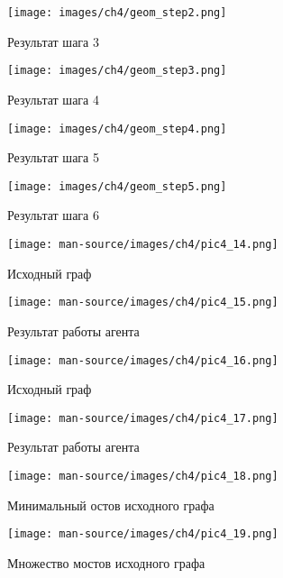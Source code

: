 \documentclass{thesisby}
\begin{document}
\begin{figure}[H]
    \centering
    \texttt{[image: images/ch4/geom\_step2.png]}
    \caption{Результат шага 3}
    \label{fig:pic_geom_step_2}
\end{figure}


\begin{figure}[H]
    \centering
    \texttt{[image: images/ch4/geom\_step3.png]}
    \caption{Результат шага 4}
    \label{fig:pic_geom_step_3}
\end{figure}


\begin{figure}[H]
    \centering
    \texttt{[image: images/ch4/geom\_step4.png]}
    \caption{Результат шага 5}
    \label{fig:pic_geom_step_4}
\end{figure}


\begin{figure}[H]
    \centering
    \texttt{[image: images/ch4/geom\_step5.png]}
    \caption{Результат шага 6}
    \label{fig:pic_geom_step_5}
\end{figure}


\begin{figure}[H]
    \centering
    \texttt{[image: man-source/images/ch4/pic4\_14.png]}
    \caption{Исходный граф}
    \label{fig:pic4_14}
\end{figure}


\begin{figure}[H]
    \centering
    \texttt{[image: man-source/images/ch4/pic4\_15.png]}
    \caption{Результат работы агента}
    \label{fig:pic4_15}
\end{figure}


\begin{figure}[H]
    \centering
    \texttt{[image: man-source/images/ch4/pic4\_16.png]}
    \caption{Исходный граф}
    \label{fig:pic4_16}
\end{figure}


\begin{figure}[H]
    \centering
    \texttt{[image: man-source/images/ch4/pic4\_17.png]}
    \caption{Результат работы агента}
    \label{fig:pic4_17}
\end{figure}


\begin{figure}[H]
    \centering
    \texttt{[image: man-source/images/ch4/pic4\_18.png]}
    \caption{Минимальный остов исходного графа}
    \label{fig:pic4_18}
\end{figure}


\begin{figure}[H]
    \centering
    \texttt{[image: man-source/images/ch4/pic4\_19.png]}
    \caption{Множество мостов исходного графа}
    \label{fig:pic4_19}
\end{figure}
\end{document}
